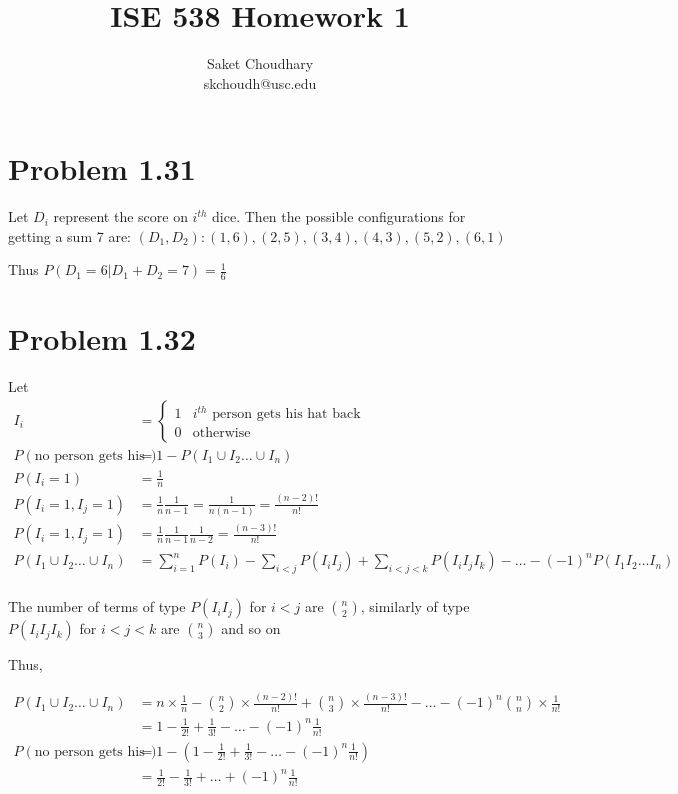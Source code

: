 \documentclass[a4paper]{article}
\title{ISE 538 Homework 1}
\author{Saket Choudhary\\skchoudh@usc.edu}
\begin{document}
\maketitle




\section*{Problem 1.31}
Let $D_i$ represent the score on $i^{th}$ dice.
Then the possible configurations for getting a sum 7 are: $(D_1, D_2): (1,6), (2,5), (3,4), (4,3), (5,2), (6,1) $

Thus $P(D_1=6|D_1+D_2=7) = \frac{1}{6}$
\section*{Problem 1.32}

Let 
\begin{align*}
I_i &= \begin{cases}
1 & i^{th}\text{ person gets his hat back}\\
0 & \text{otherwise}
\end{cases}\\
P(\text{no person gets his hat back}) &= 1 - P(I_1 \cup I_2 \dots \cup I_n)\\
P(I_i=1) &= \frac{1}{n}\\
P(I_i=1, I_j=1) &= \frac{1}{n}\frac{1}{n-1} = \frac{1}{n(n-1)} = \frac{(n-2)!}{n!}\\
P(I_i=1, I_j=1) &= \frac{1}{n}\frac{1}{n-1}\frac{1}{n-2} = \frac{(n-3)!}{n!}\\
P(I_1 \cup I_2 \dots \cup I_n) &= \sum_{i=1}^{n}P(I_i) - \sum_{i<j}P(I_iI_j) + \sum_{i<j<k}P(I_iI_jI_k) - \dots - (-1)^n P(I_1I_2\dots I_n)\\
\end{align*}

The number of terms of type $P(I_iI_j) $ for $i<j$ are $n\choose{2}$, similarly of type $P(I_iI_jI_k)$ for $i<j<k$ are $n\choose{3}$ and so on

Thus,

\begin{align*}
P(I_1 \cup I_2 \dots \cup I_n) &= n \times \frac{1}{n} - {n\choose{2}} \times \frac{(n-2)!}{n!} + {n\choose{3}} \times \frac{(n-3)!}{n!} - \dots - (-1)^n {n\choose{n}} \times \frac{1}{n!}\\
&= 1 - \frac{1}{2!} + \frac{1}{3!} - \dots - (-1)^n \frac{1}{n!}\\
P(\text{no person gets his hat back}) &= 1 - (1 - \frac{1}{2!} + \frac{1}{3!} - \dots - (-1)^n \frac{1}{n!})\\
&= \frac{1}{2!} - \frac{1}{3!} + \dots + (-1)^n \frac{1}{n!}\\
\end{align*}
\end{document}
